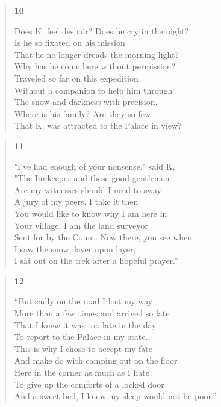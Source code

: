 \documentclass{article}
\begin{document}
\begin{verse}
  \begin{center}
    \textbf{10} \\
  \end{center}
  Does K. feel despair? Does he cry in the night? \\
  Is he so fixated on his mission \\
  That he no longer dreads the morning light? \\
  Why has he come here without permission? \\
  Traveled so far on this expedition \\
  Without a companion to help him through \\
  The snow and darkness with precision. \\
  Where is his family? Are they so few \\
  That K. was attracted to the Palace in view?
\end{verse}
\begin{verse}
  \begin{center}
    \textbf{11} \\
  \end{center}
  "I've had enough of your nonsense." said K, \\
  "The Innkeeper and these good gentlemen \\
  Are my witnesses should I need to sway \\
  A jury of my peers. I take it then \\
  You would like to know why I am here in \\
  Your village. I am the land surveyor \\
  Sent for by the Count. Now there, you see when \\
  I saw the snow, layer upon layer, \\
  I sat out on the trek after a hopeful prayer.''
\end{verse}
\newpage
\begin{verse}
  \begin{center}
    \textbf{12} \\
  \end{center}
  ``But sadly on the road I lost my way \\
  More than a few times and arrived so late \\
  That I knew it was too late in the day \\
  To report to the Palace in my state. \\
  This is why I chose to accept my fate \\
  And make do with camping out on the floor \\
  Here in the corner as much as I hate \\
  To give up the comforts of a locked door \\
  And a sweet bed, I knew my sleep would not be poor.''
\end{verse}
\end{document}
